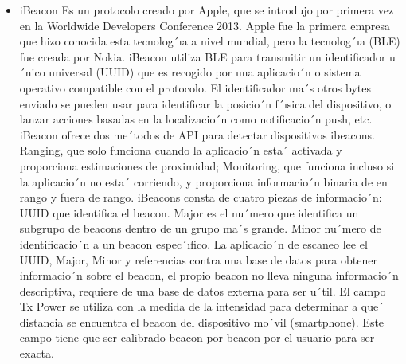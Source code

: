 \documentclass[conference,compsoc,onecolumn]{IEEEtran}
\begin{document}
\begin{itemize}
    \item iBeacon Es un protocolo creado por Apple, que se introdujo por primera vez en la Worldwide Developers Conference 2013. Apple fue la primera empresa que hizo conocida esta tecnolog´ıa a nivel mundial, pero la tecnolog´ıa (BLE) fue creada por Nokia. iBeacon utiliza BLE para transmitir un identificador u´nico universal (UUID) que es recogido por una aplicacio´n o sistema operativo compatible con el protocolo. El identificador ma´s  otros bytes  enviado  se pueden  usar para  identificar  la posicio´n  f´ısica  del dispositivo,  o  lanzar acciones basadas en la localizacio´n como notificacio´n push, etc.
    \\

iBeacon ofrece dos me´todos de API para detectar dispositivos ibeacons. Ranging, que solo funciona cuando la  aplicacio´n  esta´  activada  y  proporciona  estimaciones  de  proximidad;  Monitoring,  que  funciona  incluso  si la  aplicacio´n  no  esta´  corriendo,  y  proporciona  informacio´n  binaria  de  en  rango  y  fuera  de  rango.  iBeacons consta de cuatro piezas de informacio´n: UUID que identifica el beacon. Major es el nu´mero que identifica un subgrupo de beacons dentro de un grupo ma´s grande. Minor nu´mero de identificacio´n a un beacon espec´ıfico. La  aplicacio´n  de  escaneo  lee  el  UUID,  Major,  Minor  y  referencias  contra  una  base  de  datos  para  obtener informacio´n sobre el beacon, el propio beacon no lleva ninguna informacio´n descriptiva, requiere de una base de datos externa para ser u´til. El campo Tx Power se utiliza con la medida de la intensidad para determinar a que´  distancia se encuentra el beacon del dispositivo mo´vil (smartphone). Este campo tiene que ser calibrado beacon por beacon por el usuario para ser exacta.


\end{itemize}
\end{document}
